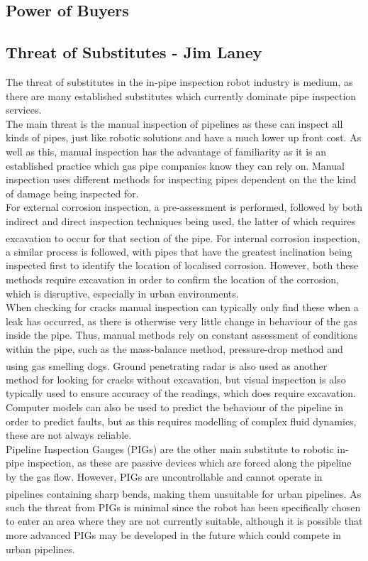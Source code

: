 \documentclass[11pt]{article}		%
\begin{document}
		\subsection[Power of Buyers]{Power of Buyers}
		
		\subsection[Threat of Substitutes]{Threat of Substitutes - Jim Laney}
			
			The threat of substitutes in the in-pipe inspection robot industry is medium, as there are many established substitutes which currently dominate pipe inspection services.
			\\
			The main threat is the manual inspection of pipelines as these can inspect all kinds of pipes, just like robotic solutions and have a much lower up front cost.
			As well as this, manual inspection has the advantage of familiarity as it is an established practice which gas pipe companies know they can rely on.
			Manual inspection uses different methods for inspecting pipes dependent on the the kind of damage being inspected for.
			\\
			For external corrosion inspection, a pre-assessment is performed, followed by both indirect and direct inspection techniques being used, the latter of which requires excavation to occur for that section of the pipe\textsuperscript{\cite{kishawy2010review}}. 
			For internal corrosion inspection, a similar process is followed, with pipes that have the greatest inclination being inspected first to identify the location of localised corrosion. 
			However, both these methods require excavation in order to confirm the location of the corrosion, which is disruptive, especially in urban environments.
			\\
			When checking for cracks manual inspection can typically only find these when a leak has occurred, as there is otherwise very little change in behaviour of the gas inside the pipe.
			Thus, manual methods rely on constant assessment of conditions within the pipe, such as the mass-balance method, pressure-drop method and using gas smelling dogs\textsuperscript{\cite{kishawy2010review}}.
			Ground penetrating radar is also used as another method for looking for cracks without excavation, but visual inspection is also typically used to ensure accuracy of the readings, which does require excavation.
			Computer models can also be used to predict the behaviour of the pipeline in order to predict faults, but as this requires modelling of complex fluid dynamics, these are not always reliable.
			\\
			Pipeline Inspection Gauges (PIGs) are the other main substitute to robotic in-pipe inspection, as these are passive devices which are forced along the pipeline by the gas flow.
			However, PIGs are uncontrollable and cannot operate in pipelines containing sharp bends\textsuperscript{\cite{mills2017advances}}, making them unsuitable for urban pipelines.
			As such the threat from PIGs is minimal since the robot has been specifically chosen to enter an area where they are not currently suitable, although it is possible that more advanced PIGs may be developed in the future which could compete in urban pipelines.
		
\end{document}
